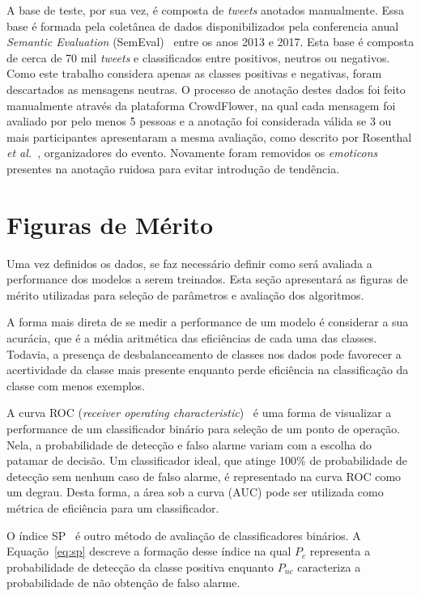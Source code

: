 A base de teste, por sua vez, é composta de \textit{tweets} anotados manualmente.
Essa base é formada pela coletânea de dados disponibilizados pela conferencia anual \textit{Semantic Evaluation}
(SemEval)~\cite{semeval17} entre os anos 2013 e 2017.
Esta base é composta de cerca de 70 mil \textit{tweets} e classificados entre positivos, neutros ou negativos.
Como este trabalho considera apenas as classes positivas e negativas, foram descartados as mensagens neutras.
O processo de anotação destes dados foi feito manualmente através da plataforma CrowdFlower, na qual cada mensagem
foi avaliado por pelo menos 5 pessoas e a anotação foi considerada válida se 3 ou mais participantes apresentaram a
mesma avaliação, como descrito por Rosenthal \textit{et al.}~\cite{rosenthal17}, organizadores do evento.
Novamente foram removidos os \textit{emoticons} presentes na anotação ruidosa para evitar introdução de tendência.

\section{Figuras de Mérito} \label{sec:metrics}

Uma vez definidos os dados, se faz necessário definir como será avaliada a performance dos modelos a serem treinados.
Esta seção apresentará as figuras de mérito utilizadas para seleção de parâmetros e avaliação dos algoritmos.

A forma mais direta de se medir a performance de um modelo é considerar a sua acurácia, que é a média aritmética das
eficiências de cada uma das classes.
Todavia, a presença de desbalanceamento de classes nos dados pode favorecer a acertividade da classe mais presente
enquanto perde eficiência na classificação da classe com menos exemplos.

A curva ROC (\textit{receiver operating characteristic})~\cite{bradley97} é uma forma de visualizar a performance de um
classificador binário para seleção de um ponto de operação.
Nela, a probabilidade de detecção e falso alarme variam com a escolha do patamar de decisão.
Um classificador ideal, que atinge 100\% de probabilidade de detecção sem nenhum caso de falso alarme, é representado na
curva ROC como um degrau.
Desta forma, a área sob a curva (AUC) pode ser utilizada como métrica de eficiência para um classificador.

O índice SP~\cite{ciodaro12} é outro método de avaliação de classificadores binários.
A Equação~\ref{eq:sp} descreve a formação desse índice na qual $P_c$ representa a probabilidade de detecção da classe
positiva enquanto $P_{nc}$ caracteriza a probabilidade de não obtenção de falso alarme.

